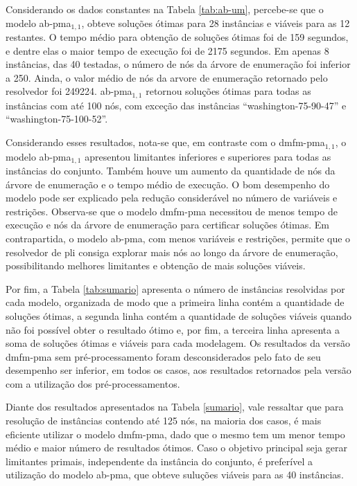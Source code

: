 Considerando os  dados constantes  na Tabela  \ref{tab:ab-um}, percebe-se  que o
modelo  \gls{ab-pma}$_{1,  1}$, obteve  soluções  ótimas  para 28  instâncias  e
viáveis para as 12 restantes. O tempo médio para obtenção de soluções ótimas foi
de 159 segundos, e  dentre elas o maior tempo de execução  foi de 2175 segundos.
Em apenas 8 instâncias, das 40 testadas, o número de nós da árvore de enumeração
foi  inferior a  250.  Ainda, o  valor  médio  de nós  da  arvore de  enumeração
retornado pelo  resolvedor foi  249224. \gls{ab-pma}$_{1, 1}$  retornou soluções
ótimas para  todas as  instâncias com  até 100 nós,  com exceção  das instâncias
``washington-75-90-47'' e ``washington-75-100-52''.

Considerando   esses    resultados,   nota-se   que,   em    contraste   com   o
\gls{dmfm-pma}$_{1, 1}$,  o modelo  \gls{ab-pma}$_{1, 1}$  apresentou limitantes
inferiores e  superiores para todas as  instâncias do conjunto. Também  houve um
aumento  da quantidade  de  nós da  árvore  de  enumeração e  o  tempo médio  de
execução.  O  bom   desempenho  do  modelo  pode  ser   explicado  pela  redução
considerável  no número  de  variáveis  e restrições.  Observa-se  que o  modelo
\gls{dmfm-pma}  necessitou  de menos  tempo  de  execução  e  nós da  árvore  de
enumeração  para   certificar  soluções  ótimas.  Em   contrapartida,  o  modelo
\gls{ab-pma},  com menos  variáveis e  restrições, permite  que o  resolvedor de
\gls{pli}  consiga  explorar  mais  nós   ao  longo  da  árvore  de  enumeração,
possibilitando melhores limitantes e obtenção de mais soluções viáveis.

\newpage
Por fim, a Tabela \ref{tab:sumario}  apresenta o número de instâncias resolvidas
por cada modelo, organizada de modo que  a primeira linha contém a quantidade de
soluções ótimas, a segunda linha contém  a quantidade de soluções viáveis quando
não foi possível obter o resultado ótimo  e, por fim, a terceira linha apresenta
a soma de soluções ótimas e viáveis para cada modelagem. Os resultados da versão
\gls{dmfm-pma}  sem pré-processamento  foram  desconsiderados pelo  fato de  seu
desempenho  ser inferior,  em todos  os  casos, aos  resultados retornados  pela
versão com a utilização dos pré-processamentos.

Diante dos resultados  apresentados na Tabela \ref{sumario},  vale ressaltar que
para resolução de instâncias contendo até 125  nós, na maioria dos casos, é mais
eficiente utilizar o modelo \gls{dmfm-pma}, dado  que o mesmo tem um menor tempo
médio e maior número de resultados  ótimos. Caso o objetivo principal seja gerar
limitantes  primais,  independente da  instância  do  conjunto, é  preferível  a
utilização  do modelo  \gls{ab-pma},  que  obteve suluções  viáveis  para as  40
instâncias.

